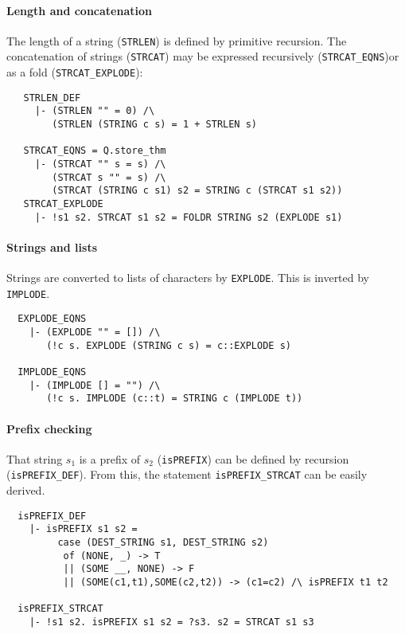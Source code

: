 \paragraph {Length and concatenation}

The length of a string ({\small\verb+STRLEN+}) is defined by primitive
recursion. The concatenation of strings ({\small\verb+STRCAT+}) may be
expressed recursively ({\small\verb+STRCAT_EQNS+})or as a fold
({\small\verb+STRCAT_EXPLODE+}):
%
{\small
\begin{verbatim}
   STRLEN_DEF
     |- (STRLEN "" = 0) /\
        (STRLEN (STRING c s) = 1 + STRLEN s)

   STRCAT_EQNS = Q.store_thm
     |- (STRCAT "" s = s) /\
        (STRCAT s "" = s) /\
        (STRCAT (STRING c s1) s2 = STRING c (STRCAT s1 s2))
   STRCAT_EXPLODE
     |- !s1 s2. STRCAT s1 s2 = FOLDR STRING s2 (EXPLODE s1)
\end{verbatim}
}


\paragraph {Strings and lists}

Strings are converted to lists of characters by
{\small\verb+EXPLODE+}. This is inverted by {\small\verb+IMPLODE+}.
%
{\small
\begin{verbatim}
  EXPLODE_EQNS
    |- (EXPLODE "" = []) /\
       (!c s. EXPLODE (STRING c s) = c::EXPLODE s)

  IMPLODE_EQNS
    |- (IMPLODE [] = "") /\
       (!c s. IMPLODE (c::t) = STRING c (IMPLODE t))
\end{verbatim}
}

\paragraph {Prefix checking}

That string $s_1$ is a prefix of $s_2$ ({\small\verb+isPREFIX+}) can be
defined by recursion ({\small\verb+isPREFIX_DEF+}). From this, the
statement {\small\verb+isPREFIX_STRCAT+} can be easily derived.
%
{\small
\begin{verbatim}
  isPREFIX_DEF
    |- isPREFIX s1 s2 =
         case (DEST_STRING s1, DEST_STRING s2)
          of (NONE, _) -> T
          || (SOME __, NONE) -> F
          || (SOME(c1,t1),SOME(c2,t2)) -> (c1=c2) /\ isPREFIX t1 t2

  isPREFIX_STRCAT
    |- !s1 s2. isPREFIX s1 s2 = ?s3. s2 = STRCAT s1 s3
\end{verbatim}
}


